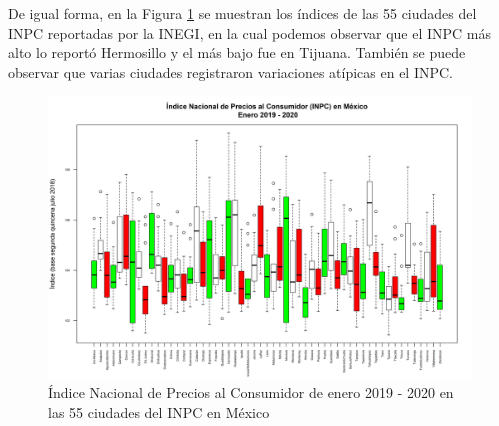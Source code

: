 \documentclass[fontsize=12pt]{article}
\begin{document}
De igual forma, en la Figura \ref{TotalCiudades} se muestran los índices de las 55 ciudades del INPC reportadas por la INEGI, en la cual podemos observar que el INPC más alto lo reportó Hermosillo y el más bajo fue en Tijuana. También se puede observar que varias ciudades registraron variaciones atípicas en el INPC.

\begin{figure}[h]
\centering
\includegraphics[scale=0.55]{TotalCiudades}
\caption{Índice Nacional de Precios al Consumidor de enero 2019 - 2020 en las 55 ciudades del INPC en México}
\label{TotalCiudades}
\end{figure}




\end{document}
